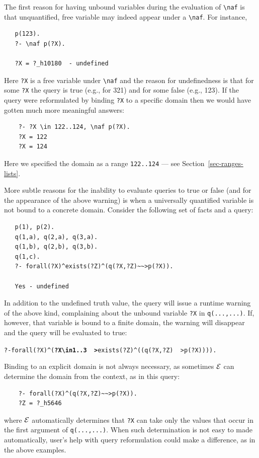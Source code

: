 \documentclass[11pt]{article}
\newcommand{\ERGO}{\mbox{\ensuremath{\cal{E}}\smaller{{\sc{RGO}}}}\xspace}
\newcommand{\FLSYSTEM}{\ERGO}
\newcommand{\bs}{\textbackslash}
\newcommand{\RULELOGNAF}{{\texttt{{\bs}naf}}\xspace}
\begin{document}
The first reason for having unbound variables during the evaluation
of \RULELOGNAF is that unquantified, free variable may indeed appear under
a \RULELOGNAF.
For instance,
\begin{verbatim}
   p(123).
   ?- \naf p(?X).

   ?X = ?_h10180  - undefined
\end{verbatim}
Here \texttt{?X} is a free variable under \RULELOGNAF and 
the reason for undefinedness is that for some \texttt{?X} the query is true
(e.g., for 321) and for some false (e.g., 123).
If the query were reformulated by binding \texttt{?X} to a specific
domain then we would have gotten much more meaningful answers:
\begin{verbatim}
    ?- ?X \in 122..124, \naf p(?X).
    ?X = 122
    ?X = 124
\end{verbatim}
Here we specified the domain as a range \texttt{122..124} --- see
Section~\ref{sec-ranges-lists}. 

More subtle reasons for the inability to evaluate queries to true or false
(and for the appearance of the above warning) is when a universally
quantified variable
is not bound to a concrete domain. Consider the following set of facts and
a query:
\begin{verbatim}
   p(1), p(2).
   q(1,a), q(2,a), q(3,a).
   q(1,b), q(2,b), q(3,b).
   q(1,c).
   ?- forall(?X)^exists(?Z)^(q(?X,?Z)~~>p(?X)).

   Yes - undefined
\end{verbatim}
In addition to the undefined truth value, the query will issue a runtime
warning of the above kind, complaining about the unbound variable
\texttt{?X} in \texttt{q(...,...)}. If, however, that variable is bound to
a finite domain, the warning will disappear and the query will be evaluated
to true:
\begin{alltt}
    ?- forall(?X)^(\textnormal{\textbf{?X \bs{}in 1..3 ~~>}} exists(?Z)^((q(?X,?Z)~~>p(?X)))).
\end{alltt}
Binding to an explicit domain is not always necessary, as sometimes
\FLSYSTEM can determine the domain from the context, as in this query:
\begin{verbatim}
    ?- forall(?X)^(q(?X,?Z)~~>p(?X)).
    ?Z = ?_h5646
\end{verbatim}
where \FLSYSTEM automatically
determines that \texttt{?X} can take only the values that
occur in the first argument of \texttt{q(...,...)}.  
When such determination is not easy to made automatically, user's help
with query reformulation could make a difference, as in the above examples.
\end{document}
